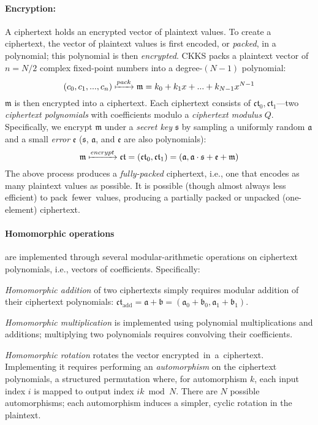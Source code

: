 \paragraph{Encryption:}
A ciphertext holds an encrypted vector of plaintext values. To create a
ciphertext, the vector of plaintext values is first encoded, or \emph{packed},
in a polynomial; this polynomial is then \emph{encrypted}. CKKS packs a
plaintext vector of $ n = N/2$ complex fixed-point numbers into a
degree-$(N-1)$ polynomial:
\begin{equation*}
    (c_0, c_1, ..., c_n) \xmapsto{pack} \mathfrak{m} = k_0 + k_1x + ... + k_{N-1}x^{N-1} %
\end{equation*}
$\mathfrak{m}$ is then encrypted into a ciphertext. Each ciphertext consists of
$\mathfrak{ct}_0, \mathfrak{ct}_1$---two \emph{ciphertext polynomials} with
coefficients modulo a \emph{ciphertext modulus} $Q$. Specifically, we encrypt
$\mathfrak{m}$ under a \emph{secret key} $\mathfrak{s}$ by sampling a uniformly
random $\mathfrak{a}$ and a small \emph{error} $\mathfrak{e}$ ($\mathfrak{s}$,
$\mathfrak{a}$, and $\mathfrak{e}$ are also polynomials):
\begin{equation*}
    \mathfrak{m} \xmapsto{encrypt} \mathfrak{ct} = (\mathfrak{ct}_0, \mathfrak{ct}_1) = (\mathfrak{a}, \mathfrak{a}\cdot\mathfrak{s}+\mathfrak{e}+\mathfrak{m})
\end{equation*}
The above process produces a \emph{fully-packed} ciphertext, i.e., one that
encodes as many plaintext values as possible. It is possible (though almost
always less efficient) to pack~fewer~values, producing a partially packed or
unpacked (one-element) ciphertext.

\paragraph{Homomorphic operations} are implemented through several
modular-arithmetic operations on ciphertext polynomials, i.e., vectors of
coefficients. Specifically:
\begin{compactitem}
\item \emph{Homomorphic addition} of two ciphertexts simply requires modular
    addition of their ciphertext polynomials: $\mathfrak{ct}_{\textrm{add}} =
    \mathfrak{a} + \mathfrak{b} = (\mathfrak{a}_0+\mathfrak{b}_0,
    \mathfrak{a}_1+\mathfrak{b}_1)$.
\item \emph{Homomorphic multiplication} is implemented using polynomial
    multiplications and additions; multiplying two polynomials requires
    convolving their coefficients.
\item \emph{Homomorphic rotation} rotates the vector encrypted~in~a~ciphertext.
    Implementing it requires performing an \emph{automorphism} on the
    ciphertext polynomials, a structured permutation where, for automorphism
    $k$, each input index $i$ is mapped to output index $ik \bmod N$. There are
    $N$ possible automorphisms; each automorphism induces a simpler, cyclic
    rotation in the plaintext.
\end{compactitem}

